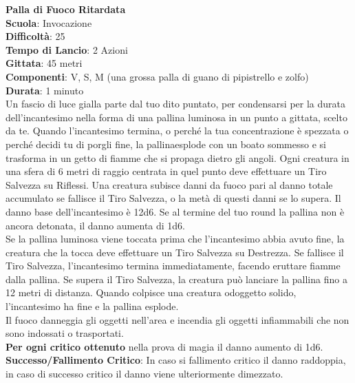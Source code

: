 \begin{multicols}{2}
\medskip\textbf{Palla di Fuoco Ritardata}\\
\textbf{Scuola}: Invocazione\\
\textbf{Difficoltà}:  25\\
\textbf{Tempo di Lancio}: 2 Azioni\\
\textbf{Gittata}: 45 metri\\
\textbf{Componenti}: V, S, M (una grossa palla di guano di pipistrello e zolfo)\\
\textbf{Durata}: 1 minuto\\
Un fascio di luce gialla parte dal tuo dito puntato, per condensarsi per la durata dell'incantesimo nella forma di una pallina luminosa in un punto a gittata, scelto da te. Quando l'incantesimo termina, o perché la tua concentrazione è spezzata o perché decidi tu di porgli fine, la pallinaesplode con un boato sommesso e si  trasforma in un getto di fiamme che si propaga dietro gli angoli. Ogni creatura in una sfera di 6 metri di raggio centrata in quel punto deve effettuare un Tiro Salvezza su Riflessi. Una creatura subisce danni da fuoco pari al danno totale accumulato se fallisce il Tiro Salvezza, o la metà di questi danni se lo supera. Il danno base dell'incantesimo è 12d6. Se al termine del tuo round la pallina non è ancora detonata, il danno aumenta di 1d6.\\
Se la pallina luminosa viene toccata prima che l'incantesimo abbia avuto fine, la creatura che la tocca deve effettuare un Tiro Salvezza su Destrezza. Se fallisce il Tiro Salvezza, l'incantesimo termina immediatamente, facendo eruttare fiamme dalla pallina. Se supera il Tiro Salvezza, la creatura può lanciare la pallina fino a 12 metri di distanza. Quando colpisce una creatura odoggetto  solido, l'incantesimo ha fine e la pallina esplode.\\
Il fuoco danneggia gli oggetti nell'area e incendia gli oggetti infiammabili che non sono indossati o trasportati.\\
\textbf{Per ogni critico ottenuto} nella prova di magia il danno aumento di 1d6.\\
\textbf{Successo/Fallimento Critico}: In caso si fallimento critico il danno raddoppia, in caso di successo critico il danno viene ulteriormente dimezzato.


\end{multicols}

